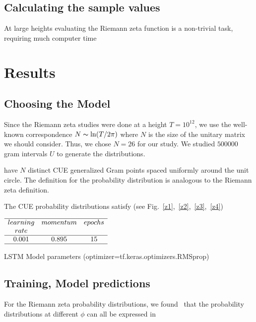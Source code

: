 \documentclass[twoside]{article}
\begin{document}
\subsection{\label{seccalc}Calculating the sample values}

At large heights evaluating the Riemann zeta function  is a non-trivial task, requiring much computer time 

\section{\label{sec3}Results}

\subsection{\label{sec3.1} Choosing the Model}

Since the Riemann zeta studies were done at a
height $T = 10^{12}$, we use the well-known correspondence $N \thicksim \ln(T/2\pi)$ where $N$ 
is the size of the unitary matrix we should consider. Thus, we chose $N = 26$ for our
study.  We studied $500000$ gram intervals $U$ to generate the distributions.

have $N$ distinct CUE generalized Gram points spaced uniformly
around the unit circle.
The definition for the probability distribution is analogous to the Riemann zeta definition.

The CUE probability distributions satisfy (see Fig.~\ref{z1},~\ref{z2},~\ref{z3},~\ref{z4}) 

\begin{table}
\centering \(\begin{array}{cccccccccccc}

\hline
learning     &momentum  &epochs  \\
rate    &  &  \\
\hline
0.001 &0.895  & 15  \\
\hline
\end{array}\)
\caption{LSTM Model parameters (optimizer=tf.keras.optimizers.RMSprop)}
\label{tab:mean12}
\end{table}


\subsection{\label{relation}Training,  Model predictions}

For the Riemann zeta probability distributions, we found~\cite{Shanker 2020}
that the probability distributions at different $\phi$ can all be expressed in
\end{document}

